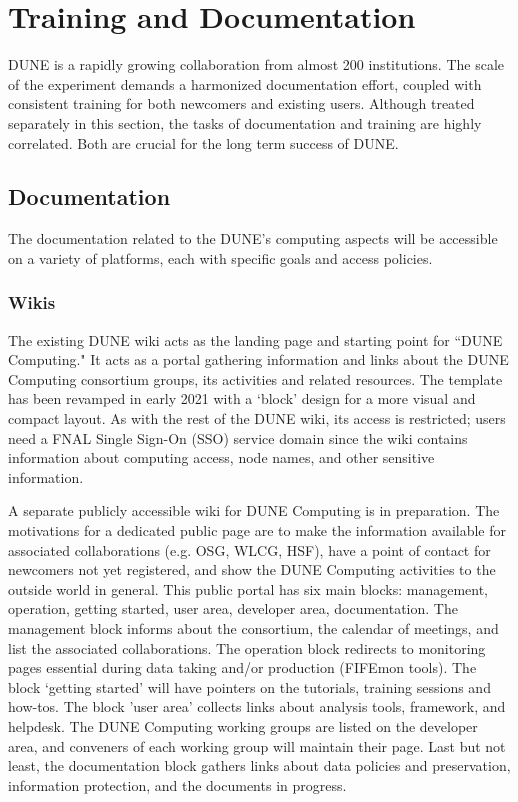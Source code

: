\chapter{Training and Documentation }
\label{ch:train}
DUNE is a rapidly growing collaboration from almost 200 institutions. The scale of the experiment demands a harmonized documentation effort, coupled with consistent training for both newcomers and existing users. Although treated separately in this section, the tasks of documentation and training are highly correlated. Both are crucial for the long term success of DUNE. 

\section{Documentation}
The documentation related to the DUNE’s computing aspects will be accessible on a variety of platforms, each with specific goals and access policies.

\subsection{Wikis}
The existing DUNE wiki acts as the landing page and starting point for ``DUNE Computing." It acts as a portal gathering information and links about the DUNE Computing consortium groups, its activities and related resources. The template has been revamped in early 2021 with a ‘block’ design for a more visual and compact layout. As with the rest of the DUNE wiki, its access is restricted; users need a FNAL Single Sign-On (SSO) service domain since the wiki contains information about computing access, node names, and other sensitive information.

A separate publicly accessible wiki for DUNE Computing is in preparation. The motivations for a dedicated public page are to make the information available for associated collaborations (e.g. OSG, WLCG, HSF), have a point of contact for newcomers not yet registered, and show the DUNE Computing activities to the outside world in general. This public portal has six main blocks: management, operation, getting started, user area, developer area, documentation. The management block informs about the consortium, the calendar of meetings, and list the associated collaborations. The operation block redirects to monitoring pages essential during data taking and/or production (FIFEmon tools). The block ‘getting started’ will have pointers on the tutorials, training sessions and how-tos. The block 'user area' collects links about analysis tools, framework, and helpdesk. The DUNE Computing working groups are listed on the developer area, and conveners of each working group will maintain their page. Last but not least, the documentation block gathers links about data policies and preservation, information protection, and the documents in progress.

